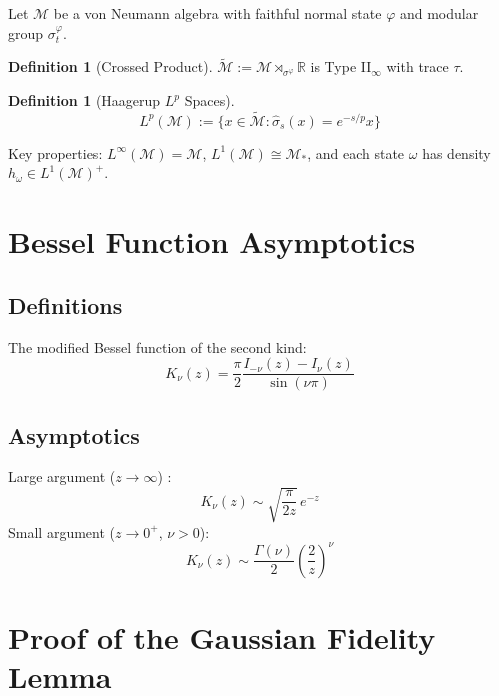 \documentclass[11pt,a4paper]{article}
\theoremstyle{plain}
\theoremstyle{definition}
\newtheorem{definition}[theorem]{Definition}
\theoremstyle{remark}
\newcommand{\Mm}{\mathcal{M}}
\newcommand{\R}{\mathbb{R}}
\begin{document}
Let $\Mm$ be a von Neumann algebra with faithful normal state $\varphi$ and modular
group $\sigma_t^\varphi$.

\begin{definition}[Crossed Product]
$\widetilde{\Mm} := \Mm \rtimes_{\sigma^\varphi} \R$ is Type II$_\infty$ with trace
$\tau$.
\end{definition}

\begin{definition}[Haagerup $L^p$ Spaces]
\begin{equation}
L^p(\Mm) := \{x \in \widetilde{\Mm} : \hat{\sigma}_s(x) = e^{-s/p} x\}
\end{equation}
\end{definition}

Key properties: $L^\infty(\Mm) = \Mm$, $L^1(\Mm) \cong \Mm_*$, and each state
$\omega$ has density $h_\omega \in L^1(\Mm)^+$.

\section{Bessel Function Asymptotics}\label{app:bessel}

\subsection{Definitions}

The modified Bessel function of the second kind:
\begin{equation}
K_\nu(z) = \frac{\pi}{2} \frac{I_{-\nu}(z) - I_\nu(z)}{\sin(\nu\pi)}
\end{equation}

\subsection{Asymptotics}

Large argument ($z \to \infty$) \cite[\S10.40]{NIST}:
\begin{equation}
K_\nu(z) \sim \sqrt{\frac{\pi}{2z}}\, e^{-z}
\end{equation}
Small argument ($z \to 0^+$, $\nu > 0$):
\begin{equation}
K_\nu(z) \sim \frac{\Gamma(\nu)}{2}\left(\frac{2}{z}\right)^{\nu}
\end{equation}

\section{Proof of the Gaussian Fidelity Lemma}\label{app:fidelity}
\end{document}
